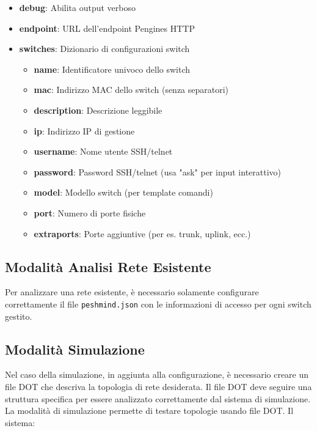 \documentclass[12pt,a4paper]{article}
\begin{document}
\begin{itemize}
    \item \textbf{debug}: Abilita output verboso
    \item \textbf{endpoint}: URL dell'endpoint Pengines HTTP
    \item \textbf{switches}: Dizionario di configurazioni switch
    \begin{itemize}
        \item \textbf{name}: Identificatore univoco dello switch
        \item \textbf{mac}: Indirizzo MAC dello switch (senza separatori)
        \item \textbf{description}: Descrizione leggibile
        \item \textbf{ip}: Indirizzo IP di gestione
        \item \textbf{username}: Nome utente SSH/telnet
        \item \textbf{password}: Password SSH/telnet (usa "ask" per input interattivo)
        \item \textbf{model}: Modello switch (per template comandi)
        \item \textbf{port}: Numero di porte fisiche
        \item \textbf{extraports}: Porte aggiuntive (per es. trunk, uplink, ecc.)
    \end{itemize}
\end{itemize}

\subsection{Modalità Analisi Rete Esistente}
Per analizzare una rete esistente, è necessario solamente configurare correttamente il file \texttt{peshmind.json} 
con le informazioni di accesso per ogni switch gestito.

\subsection{Modalità Simulazione}

Nel caso della simulazione, in aggiunta alla configurazione, è necessario creare un file DOT che descriva la topologia
di rete desiderata. Il file DOT deve seguire una struttura specifica per essere analizzato correttamente dal sistema
di simulazione.
La modalità di simulazione permette di testare topologie usando file DOT. Il sistema:
\end{document}
